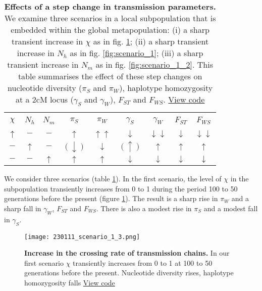 \documentclass[_main.tex]{subfiles}
\begin{document}
 \begin{table}[h!] 
\centering
\small{
\begin{tabular}{c c c | c c c c c c} 
\hline \\
$\chi$ & $N_h$ & $N_m$ & $\pi_S$ & $\pi_W$ & $\gamma_S$ & $\gamma_W$ & $F_{ST}$ & $F_{WS}$ \\ [0.5ex] 
\hline \\
$\uparrow$ & $ - $ & $-$ & $\uparrow$ & $\uparrow \uparrow$ & $\downarrow$ & $\downarrow \downarrow$ & $\downarrow$ & $\downarrow \downarrow$ \\ [2ex]
$-$ & $ \uparrow $ & $-$ & $(\downarrow)$ & $\downarrow$ & $(\uparrow)$ & $\uparrow$ & $\uparrow$ & $\uparrow$  \\ [2ex]
$-$ & $ - $ & $ \uparrow$ & $\uparrow$ & $\uparrow$ & $\downarrow$ & $\downarrow$ & $\downarrow$ & $\downarrow$ \\ [2ex]
\hline
\end{tabular}
}
\caption{\small{\textbf{Effects of a step change in transmission parameters.}  We examine three scenarios in a local subpopulation that is embedded within the global metapopulation: (i) a sharp transient increase in $\chi$ as in fig. \ref{fig:scenario_1_3}; (ii) a sharp transient increase in $N_h$ as in fig. \ref{fig:scenario_1}; (iii) a sharp transient increase in $N_m$ as in fig.  \ref{fig:scenario_1_2}.   This table summarises the effect of these step changes on nucleotide diversity ($\pi_S$ and $\pi_W$), haplotype homozygosity at a 2cM locus ($\gamma_S$ and $\gamma_W$), $F_{ST}$ and $F_{WS}$.
\href{https://github.com/d-kwiat/gtg/blob/main/scenario_1.ipynb}{View code}}
}
\label{table:scenario_effects}
\end{table}

We consider three scenarios (table \ref{table:scenario_effects}).  In the first scenario, the level of $\chi$ in the subpopulation transiently increases from 0 to 1 during the period 100 to 50 generations before the present (figure \ref{fig:scenario_1_3}).   The result is a sharp rise in $\pi_W$ and a sharp fall in $\gamma_W$, $F_{ST}$ and $F_{WS}$.  There is also a modest rise in $\pi_S$ and a modest fall in $\gamma_S$.

  \begin{figure}[h!]
\centering
\texttt{[image: 230111\_scenario\_1\_3.png]}
\caption{\textbf{Increase in the crossing rate of transmission chains.}  In our first scenario $\chi$ transiently increases from 0 to 1 at 100 to 50 generations before the present.  Nucleotide diversity rises, haplotype homozygosity falls
\href{https://github.com/d-kwiat/gtg/blob/main/scenario_1.ipynb}{View code}
}
\label{fig:scenario_1_3}
\end{figure}
\end{document}
